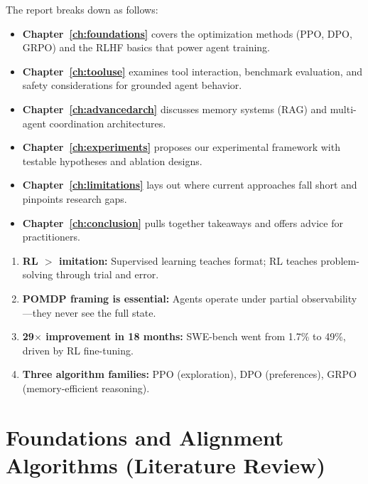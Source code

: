 \documentclass[12pt,a4paper]{report}
\theoremstyle{definition}
\begin{document}
The report breaks down as follows:
\begin{itemize}
    \item \textbf{Chapter~\ref{ch:foundations}} covers the optimization methods (PPO, DPO, GRPO) and the RLHF basics that power agent training.
    \item \textbf{Chapter~\ref{ch:tooluse}} examines tool interaction, benchmark evaluation, and safety considerations for grounded agent behavior.
    \item \textbf{Chapter~\ref{ch:advancedarch}} discusses memory systems (RAG) and multi-agent coordination architectures.
    \item \textbf{Chapter~\ref{ch:experiments}} proposes our experimental framework with testable hypotheses and ablation designs.
    \item \textbf{Chapter~\ref{ch:limitations}} lays out where current approaches fall short and pinpoints research gaps.
    \item \textbf{Chapter~\ref{ch:conclusion}} pulls together takeaways and offers advice for practitioners.
\end{itemize}

\begin{tcolorbox}[colback=cyan!5!white, colframe=cyan!60!black, title=\textbf{Chapter 1 Key Takeaways}]
\begin{enumerate}
    \item \textbf{RL $>$ imitation:} Supervised learning teaches format; RL teaches problem-solving through trial and error.
    \item \textbf{POMDP framing is essential:} Agents operate under partial observability---they never see the full state.
    \item \textbf{29$\times$ improvement in 18 months:} SWE-bench went from 1.7\% to 49\%, driven by RL fine-tuning.
    \item \textbf{Three algorithm families:} PPO (exploration), DPO (preferences), GRPO (memory-efficient reasoning).
\end{enumerate}
\end{tcolorbox}




\chapter{Foundations and Alignment Algorithms (Literature Review)}
\end{document}
